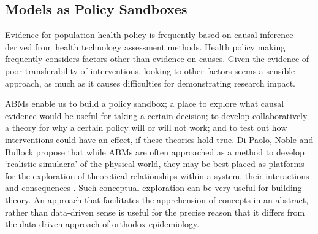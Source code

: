 \documentclass[review]{elsarticle}
\begin{document}
\subsection{Models as Policy Sandboxes}

Evidence for population health policy is frequently based on causal inference derived from health technology assessment methods. Health policy making frequently considers factors other than evidence on causes. Given the evidence of poor transferability of interventions, looking to other factors seems a sensible approach, as much as it causes difficulties for demonstrating research impact.  

ABMs enable us to build a policy sandbox; a place to explore what causal evidence would be useful for taking a certain decision; to develop collaboratively a theory for why a certain policy will or will not work; and to test out how interventions could have an effect, if these theories hold true. Di Paolo, Noble and Bullock propose that while ABMs are often approached as a method to develop `realistic simulacra' of the physical world, they may be best placed as platforms for the exploration of theoretical relationships within a system, their interactions and consequences \citep{dipaolo2000}. Such conceptual exploration can be very useful for building theory. An approach that facilitates the apprehension of concepts in an abstract, rather than data-driven sense is useful for the precise reason that it differs from the data-driven approach of orthodox epidemiology. 
\end{document}
